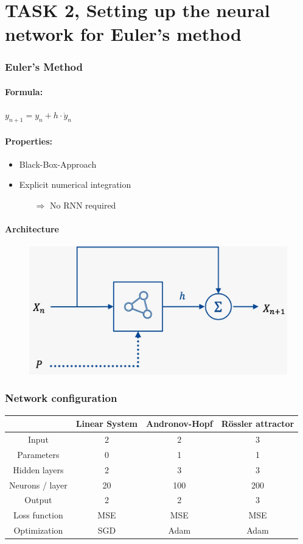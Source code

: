 \section{TASK 2, Setting up the neural network for Euler's method}

\begin{frame}
	\frametitle{Euler's Method}
	\paragraph{Formula:}\vspace{-1mm}
	\quad\quad $y_{n+1} = y_n + h \cdot \dot{y}_n$
	\vspace{1mm}
	
	\paragraph{Properties:}\vspace{-2mm}
	\begin{itemize}
		\item Black-Box-Approach
		\item Explicit numerical integration
		\begin{itemize}
			\item[$\Rightarrow$] No RNN required
		\end{itemize}
	\end{itemize}
	
	\paragraph{Architecture}\vspace{2mm}
	\begin{figure}[H]
		\centering
		\includegraphics[width=.5\linewidth]{figures/euler/net_architecture}
	\end{figure}
\end{frame}

\begin{frame}
	\frametitle{Network configuration}
	\centering
	\begin{tabular} { c | c | c | c}
						& Linear System & Andronov-Hopf & R\"ossler attractor	\\
		\hline
		Input			& 2 		& 2			& 3			\\
		\hline
		Parameters		& 0 		& 1			& 1			\\
		\hline
		Hidden layers	& 2			& 3			& 3			\\
		\hline
		Neurons / layer	& 20		& 100		& 200		\\
		\hline
		Output			& 2			& 2			& 3			\\
		\hline
		Loss function	& MSE		& MSE		& MSE		\\
		\hline
		Optimization	& SGD		& Adam		& Adam		\\
	\end{tabular}
\end{frame}
